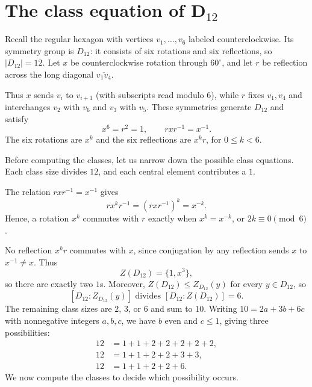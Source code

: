 \documentclass[reqno,11pt]{amsart}
\begin{document}
\raggedbottom
\makelecturetitle

\section{The class equation of D\texorpdfstring{$_{12}$}{12}}

Recall the regular hexagon with vertices $v_1,\ldots,v_6$ labeled
counterclockwise. Its symmetry group is $D_{12}$: it consists of
six rotations and six reflections, so $|D_{12}|=12$.
Let $x$ be counterclockwise rotation through $60^\circ$, and let
$r$ be reflection across the long diagonal $\overline{v_1v_4}$.

\begin{center}
\end{center}

Thus $x$ sends $v_i$ to $v_{i+1}$ (with subscripts read modulo $6$),
while $r$ fixes $v_1,v_4$ and interchanges $v_2$ with $v_6$ and
$v_3$ with $v_5$. These symmetries generate $D_{12}$ and satisfy
\[
  x^6=r^2=1,\qquad rxr^{-1}=x^{-1}.
\]
The six rotations are $x^k$ and the six reflections are $x^kr$,
for $0\leq k<6$.

Before computing the classes, let us narrow down the possible class
equations. Each class size divides $12$, and each central element
contributes a $1$.

The relation $rxr^{-1}=x^{-1}$ gives
\[
  rx^kr^{-1}=(rxr^{-1})^k=x^{-k}.
\]
Hence, a rotation $x^k$ commutes with $r$ exactly when
$x^k=x^{-k}$, or $2k\equiv0\pmod6$.

No reflection $x^kr$ commutes with
$x$, since conjugation by any reflection sends $x$ to $x^{-1}\neq x$.
Thus
\[
  Z(D_{12})=\{1,x^3\},
\]
so there are exactly two $1$s. Moreover, $Z(D_{12})\leq Z_{D_{12}}(y)$
for every $y\in D_{12}$, so
\[
  [D_{12}:Z_{D_{12}}(y)]\text{ divides }[D_{12}:Z(D_{12})]=6.
\]
The remaining class sizes are $2$, $3$, or $6$ and sum to $10$.
Writing $10=2a+3b+6c$ with nonnegative integers $a,b,c$, we have
$b$ even and $c\leq1$, giving three possibilities:
\[
\begin{aligned}
  12&=1+1+2+2+2+2+2,\\
  12&=1+1+2+2+3+3,\\
  12&=1+1+2+2+6.
\end{aligned}
\]
We now compute the classes to decide which possibility occurs.
\end{document}
